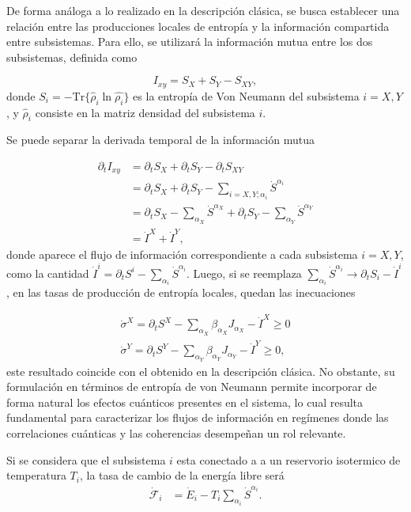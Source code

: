 De forma análoga a lo realizado en la descripción clásica, se busca establecer una relación entre las producciones locales de entropía y la información compartida entre subsistemas. Para ello, se utilizará la información mutua entre los dos subsistemas, definida como
 
\begin{equation*}
    I_{xy} = S_{X} + S_{Y} - S_{XY},
\end{equation*}
donde $S_{i} = - \text{Tr}\{\hat{\rho}_{i}\ln \hat{\rho_{i}}\}$ es la entropía de Von Neumann del subsistema $i=X,Y$, y $\hat{\rho}_{i}$ consiste en la matriz densidad del subsistema $i$. 

Se puede separar la derivada temporal de la información mutua

\begin{align*}
    \partial_{t}I_{xy} & = \partial_{t}S_{X} + \partial_{t}S_{Y} - \partial_{t}S_{XY} \\
        & = \partial_{t}S_{X} + \partial_{t}S_{Y} - \sum_{i=X,Y;\alpha_{i}}\dot{S}^{\alpha_{i}} \\
        & =  \partial_{t}S_{X} - \sum_{\alpha_{X}} \dot{S}^{\alpha_{X}} + \partial_{t}S_{Y} - \sum_{\alpha_{Y}} \dot{S}^{\alpha_{Y}} \\
        & = \dot{I}^{X} + \dot{I}^{Y},
\end{align*}
donde aparece el flujo de información correspondiente a cada subsistema $i=X,Y$, como la cantidad $\dot{I}^{i} = \partial_{t}S^{i} - \sum_{\alpha_{i}} \dot{S}^{\alpha_{i}} $. Luego, si se reemplaza $\sum_{\alpha_{i}}\dot{S}^{\alpha_{i}} \to \partial_{t}S_{i} - \dot{I}^{i}$, en las tasas de producción de entropía locales, quedan las inecuaciones  

\begin{align*}
    \dot{\sigma}^{X} = \partial_{t}S^{X} - \sum_{\alpha_{X}} \beta_{\alpha_{X}} J_{\alpha_{X}} - \dot{I}^{X} \geq 0 \\
    \dot{\sigma}^{Y} = \partial_{t}S^{Y} - \sum_{\alpha_{Y}} \beta_{\alpha_{Y}} J_{\alpha_{Y}} - \dot{I}^{Y} \geq 0,
\end{align*}
este resultado coincide con el obtenido en la descripción clásica. No obstante, su formulación en términos de entropía de von Neumann permite incorporar de forma natural los efectos cuánticos presentes en el sistema, lo cual resulta fundamental para caracterizar los flujos de información en regímenes donde las correlaciones cuánticas y las coherencias desempeñan un rol relevante.

Si se considera que el subsistema $i$ esta conectado a a un reservorio isotermico de temperatura $T_i$, la tasa de cambio de la energía libre será
\begin{align*}
    \dot{\mathcal{F}}_{i} & = \dot{E}_{i} - T_{i} \sum_{\alpha_{i}}\dot{S}^{\alpha_{i}}. 
\end{align*}

